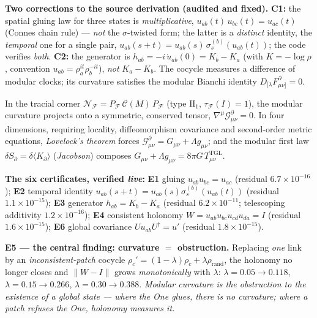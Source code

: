 \documentclass[11pt]{article}
\theoremstyle{definition}\newtheorem{deriv}{Derivation}
\begin{document}
\textbf{Two corrections to the source derivation (audited and fixed).} \textbf{C1:} the spatial gluing law for three states is \emph{multiplicative}, $u_{ab}(t)\,u_{bc}(t)=u_{ac}(t)$ (Connes chain rule) --- \emph{not} the $\sigma$-twisted form; the latter is a \emph{distinct} identity, the \emph{temporal} one for a single pair, $u_{ab}(s{+}t)=u_{ab}(s)\,\sigma_s^{(b)}(u_{ab}(t))$; the code verifies \emph{both}. \textbf{C2:} the generator is $h_{ab}=-i\,\dot u_{ab}(0)=K_b-K_a$ (with $K=-\log\rho$, convention $u_{ab}=\rho_a^{it}\rho_b^{-it}$), \emph{not} $K_a-K_b$. The cocycle measures a difference of modular clocks; its curvature satisfies the modular Bianchi identity $D_{[\lambda}F^\partial_{\mu\nu]}=0$.

In the tracial corner $\mathcal N_{\mathcal F}=P_{\mathcal F}\,\mathcal C(M)\,P_{\mathcal F}$ (type $\mathrm{II}_1$, $\tau_{\mathcal F}(I)=1$), the modular curvature projects onto a symmetric, conserved tensor, $\nabla^\mu\mathcal G^\partial_{\mu\nu}=0$. In four dimensions, requiring locality, diffeomorphism covariance and second-order metric equations, \emph{Lovelock's theorem} forces $\mathcal G^\partial_{\mu\nu}=G_{\mu\nu}+\Lambda g_{\mu\nu}$; and the modular first law $\delta S_\partial=\delta\langle K_\partial\rangle$ (\emph{Jacobson}) composes $G_{\mu\nu}+\Lambda g_{\mu\nu}=8\pi G\,T^{\mathrm{TGL}}_{\mu\nu}$.

\textbf{The six certificates, verified \emph{live}:} \textbf{E1} gluing $u_{ab}u_{bc}=u_{ac}$ (residual $6.7\times10^{-16}$); \textbf{E2} temporal identity $u_{ab}(s{+}t)=u_{ab}(s)\sigma_s^{(b)}(u_{ab}(t))$ (residual $1.1\times10^{-15}$); \textbf{E3} generator $h_{ab}=K_b-K_a$ (residual $6.2\times10^{-11}$; telescoping additivity $1.2\times10^{-16}$); \textbf{E4} consistent holonomy $W=u_{ab}u_{bc}u_{cd}u_{da}=I$ (residual $1.6\times10^{-15}$); \textbf{E6} global covariance $U u_{ab}U^\dagger=u'$ (residual $1.8\times10^{-15}$).

\textbf{E5 --- the central finding: curvature $=$ obstruction.} Replacing \emph{one} link by an \emph{inconsistent-patch} cocycle $\rho_c'=(1-\lambda)\rho_c+\lambda\rho_{\mathrm{rand}}$, the holonomy no longer closes and $\lVert W-I\rVert$ grows \emph{monotonically} with $\lambda$: $\lambda{=}0.05\to0.118$, $\lambda{=}0.15\to0.266$, $\lambda{=}0.30\to0.388$. \emph{Modular curvature is the obstruction to the existence of a global state --- where the One glues, there is no curvature; where a patch refuses the One, holonomy measures it.}
\end{document}
